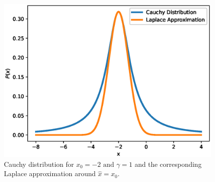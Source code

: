 \documentclass[11pt]{article}
\begin{document}
    \begin{figure}[H]
        \begin{center}
            \includegraphics[width=.75\textwidth]{plots/laplace_approximation.eps}
        \end{center}
        \caption{Cauchy distribution for $x_{0} = -2 \text{ and } \gamma = 1$
        and the corresponding Laplace approximation around $\hat{x} = x_{0}$.}
    \end{figure}
\end{document}
